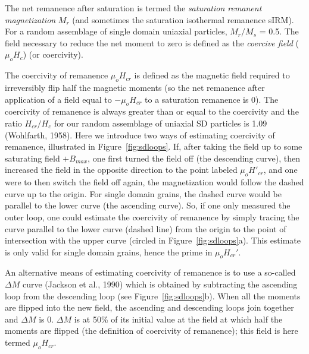 
The net remanence after saturation is termed the 
{\it saturation remanent magnetization} $M_r$ (and sometimes the saturation isothermal remanence sIRM).  For a random assemblage of single domain uniaxial particles, $M_r/M_s$ = 0.5.   The field necessary to reduce the net moment to zero is defined as the 
{\it coercive field} ($\mu_oH_c$) (or coercivity).  




The 
coercivity of remanence $\mu_o H_{cr}$ is defined as the magnetic field required to irreversibly flip half the magnetic moments (so the net remanence after application of a field equal to $-\mu_oH_{cr}$ to a saturation remanence is 0).  The coercivity of remanence is always greater than or equal to the coercivity and the ratio $H_{cr}/H_c$ for our random assemblage of uniaxial SD particles is 1.09
 \nocite{wohlfarth58}    
 (Wohlfarth, 1958).   Here we introduce two ways of estimating coercivity of remanence, illustrated in Figure~\ref{fig:sdloops}.  
  If, after taking the field up to some saturating field $+B_{max}$, one first turned the field off (the descending curve), then increased the field in the opposite direction to the point labeled $\mu_oH'_{cr}$, 
and one were to then switch the field off again, the magnetization would follow the dashed curve up to the origin.   For single domain grains, the dashed curve would be  parallel to the lower curve (the ascending curve).  So, if one only measured the outer loop, one could estimate the coercivity of remanence by simply tracing the curve parallel to the lower curve (dashed line) from the origin to the point of intersection with the upper curve (circled in Figure~\ref{fig:sdloops}a).    This estimate is only valid for single domain grains, hence the prime in $\mu_oH_{cr}'$.   



 

 An alternative means of estimating coercivity of remanence  is to use  a so-called 
 $\Delta M$ curve 
 \nocite{jackson90} 
 (Jackson et al., 1990) which is obtained by subtracting the  ascending loop  from the descending loop (see  Figure~\ref{fig:sdloops}b).  When all the moments are flipped into the new field, the ascending and descending loops join together and $\Delta M$ is 0.  $\Delta M$ is at 50\% of its initial value at the field at which  half the  moments are flipped (the definition of coercivity of remanence); this field is here termed $\mu_oH_{cr}$.   
 



